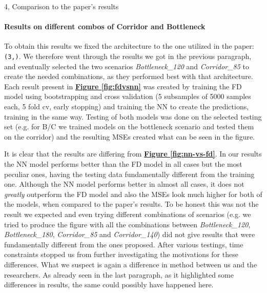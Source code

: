 \documentclass[10pt,a4paper]{article}
\begin{document}
\begin{task}{4, Comparison to the paper's results}
\paragraph{Results on different combos of Corridor and Bottleneck}
To obtain this results we fixed the architecture to the one utilized in the paper: \texttt{(3,)}. We therefore went through the results we got in the previous paragraph, and eventually selected the two scenarios \textit{Bottleneck\_120} and \textit{Corridor\_85} to create the needed combinations, as they performed best with that architecture. Each result present in \textbf{\hyperref[fig:fdvsnn]{Figure \ref{fig:fdvsnn}}} was created by training the FD model using bootstrapping and cross validation (5 subsamples of 5000 samples each, 5 fold cv, early stopping) and training the NN to create the predictions, training in the same way. Testing of both models was done on the selected testing set (e.g. for B/C we trained models on the bottleneck scenario and tested them on the corridor) and the resulting MSEs created what can be seen in the figure.

It is clear that the results are differing from \textbf{\hyperref[fig:nn-vs-fd]{Figure \ref{fig:nn-vs-fd}}}. In our results the NN model performs better than the FD model in all cases but the most peculiar ones, having the testing data fundamentally different from the training one. Although the NN model performs better in almost all cases, it does not \textit{greatly} outperform the FD model and also the MSEs look much higher for both of the models, when compared to the paper's results. To be honest this was not the result we expected and even trying different combinations of scenarios (e.g. we tried to produce the figure with all the combinations between \textit{Bottleneck\_120}, \textit{Bottleneck\_180}, \textit{Corridor\_85} and \textit{Corridor\_140}) did not give results that were fundamentally different from the ones proposed. After various testings, time constraints stopped us from further investigating the motivations for these differences. What we suspect is again a difference in method between us and the researchers. As already seen in the last paragraph, as it highlighted some differences in results, the same could possibly have happened here.


\end{task}
\end{document}
